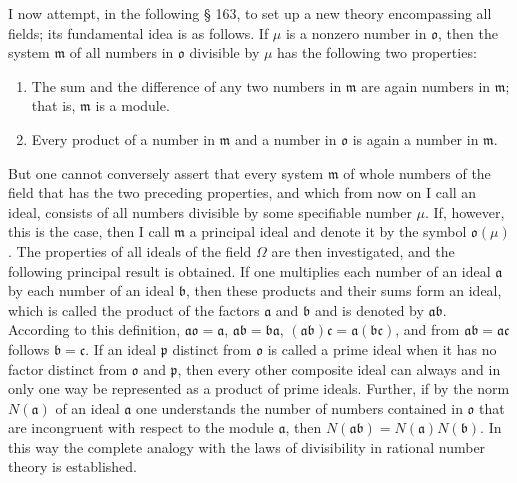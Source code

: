 \documentclass[11pt]{article}
\newcommand{\origpage}[1]{\par\vspace{0.25em}\noindent{\footnotesize\itshape [Printed page #1]}\par\vspace{0.25em}}
\newcommand{\ideal}[1]{\mathfrak{#1}}
\begin{document}
\origpage{403}
I now attempt, in the following § 163, to set up a new theory encompassing all fields; its fundamental idea is as follows. If $\mu$ is a nonzero number in $\ideal{o}$, then the system $\ideal{m}$ of all numbers in $\ideal{o}$ divisible by $\mu$ has the following two properties:
\begin{enumerate}[label=\Roman*.]
\item The sum and the difference of any two numbers in $\ideal{m}$ are again numbers in $\ideal{m}$; that is, $\ideal{m}$ is a module.
\item Every product of a number in $\ideal{m}$ and a number in $\ideal{o}$ is again a number in $\ideal{m}$.
\end{enumerate}
But one cannot conversely assert that every system $\ideal{m}$ of whole numbers of the field that has the two preceding properties, and which from now on I call an ideal, consists of all numbers divisible by some specifiable number $\mu$. If, however, this is the case, then I call $\ideal{m}$ a principal ideal and denote it by the symbol $\ideal{o}(\mu)$. The properties of all ideals of the field $\Omega$ are then investigated, and the following principal result is obtained. If one multiplies each number of an ideal $\ideal{a}$ by each number of an ideal $\ideal{b}$, then these products and their sums form an ideal, which is called the product of the factors $\ideal{a}$ and $\ideal{b}$ and is denoted by $\ideal{a}\ideal{b}$. According to this definition, $\ideal{a}\ideal{o}=\ideal{a}$, $\ideal{a}\ideal{b}=\ideal{b}\ideal{a}$, $(\ideal{a}\ideal{b})\ideal{c}=\ideal{a}(\ideal{b}\ideal{c})$, and from $\ideal{a}\ideal{b}=\ideal{a}\ideal{c}$ follows $\ideal{b}=\ideal{c}$. If an ideal $\ideal{p}$ distinct from $\ideal{o}$ is called a prime ideal when it has no factor distinct from $\ideal{o}$ and $\ideal{p}$, then every other composite ideal can always and in only one way be represented as a product of prime ideals. Further, if by the norm $N(\ideal{a})$ of an ideal $\ideal{a}$ one understands the number of numbers contained in $\ideal{o}$ that are incongruent with respect to the module $\ideal{a}$, then $N(\ideal{a}\ideal{b})=N(\ideal{a})N(\ideal{b})$. In this way the complete analogy with the laws of divisibility in rational number theory is established.
\end{document}
